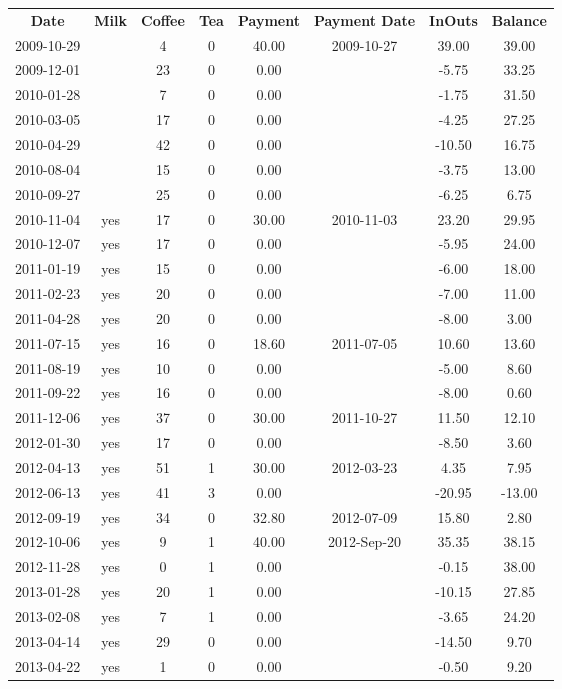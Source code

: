 \begin{center}
\begin{tabular}{cccccccc}
\textbf{Date} & \textbf{Milk} & \textbf{Coffee} & \textbf{Tea} & \textbf{Payment} & \textbf{Payment Date} & \textbf{InOuts} & \textbf{Balance} \\
2009-10-29 &  &  4 & 0 & 40.00 & 2009-10-27 &  39.00 &  39.00\\ 
2009-12-01 &  & 23 & 0 &  0.00 &  &  -5.75 &  33.25\\ 
2010-01-28 &  &  7 & 0 &  0.00 &  &  -1.75 &  31.50\\ 
2010-03-05 &  & 17 & 0 &  0.00 &  &  -4.25 &  27.25\\ 
2010-04-29 &  & 42 & 0 &  0.00 &  & -10.50 &  16.75\\ 
2010-08-04 &  & 15 & 0 &  0.00 &  &  -3.75 &  13.00\\ 
2010-09-27 &  & 25 & 0 &  0.00 &  &  -6.25 &   6.75\\ 
2010-11-04 & yes & 17 & 0 & 30.00 & 2010-11-03 &  23.20 &  29.95\\ 
2010-12-07 & yes & 17 & 0 &  0.00 &  &  -5.95 &  24.00\\ 
2011-01-19 & yes & 15 & 0 &  0.00 &  &  -6.00 &  18.00\\ 
2011-02-23 & yes & 20 & 0 &  0.00 &  &  -7.00 &  11.00\\ 
2011-04-28 & yes & 20 & 0 &  0.00 &  &  -8.00 &   3.00\\ 
2011-07-15 & yes & 16 & 0 & 18.60 & 2011-07-05 &  10.60 &  13.60\\ 
2011-08-19 & yes & 10 & 0 &  0.00 &  &  -5.00 &   8.60\\ 
2011-09-22 & yes & 16 & 0 &  0.00 &  &  -8.00 &   0.60\\ 
2011-12-06 & yes & 37 & 0 & 30.00 & 2011-10-27 &  11.50 &  12.10\\ 
2012-01-30 & yes & 17 & 0 &  0.00 &  &  -8.50 &   3.60\\ 
2012-04-13 & yes & 51 & 1 & 30.00 & 2012-03-23 &   4.35 &   7.95\\ 
2012-06-13 & yes & 41 & 3 &  0.00 &  & -20.95 & -13.00\\ 
2012-09-19 & yes & 34 & 0 & 32.80 & 2012-07-09 &  15.80 &   2.80\\ 
2012-10-06 & yes &  9 & 1 & 40.00 & 2012-Sep-20 &  35.35 &  38.15\\ 
2012-11-28 & yes &  0 & 1 &  0.00 &  &  -0.15 &  38.00\\ 
2013-01-28 & yes & 20 & 1 &  0.00 &  & -10.15 &  27.85\\ 
2013-02-08 & yes &  7 & 1 &  0.00 &  &  -3.65 &  24.20\\ 
2013-04-14 & yes & 29 & 0 &  0.00 &  & -14.50 &   9.70\\ 
2013-04-22 & yes &  1 & 0 &  0.00 &  &  -0.50 &   9.20
\end{tabular}
\end{center}

